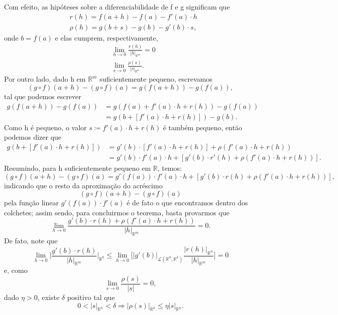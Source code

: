 \documentclass[../analysisII_notes.tex]{subfiles}
\begin{document}
\begin{proof*}
	Com efeito, as hipóteses sobre a diferenciabilidade de f e g significam que
	\begin{align*}
		 & r(h) = f(a+h) - f(a) - f'(a) \cdot h     \\
		 & \rho(h) = g(b+s) - g(b) - g'(b) \cdot s,
	\end{align*}
	onde \(b = f(a)\) e elas cumprem, respectivamente,
	\begin{align*}
		 & \lim_{h\to 0}\frac{r(h)}{|h|_{\mathbb{R}^{m}}} = 0  \\
		 & \lim_{s\to 0}\frac{\rho (s)}{|s|_{\mathbb{R}^{n}}}.
	\end{align*}
	Por outro lado, dado h em \(\mathbb{R}^{m}\) suficientemente pequeno, escrevamos
	\[
		(g\circ f)(a+h) - (g\circ f)(a) = g(f(a+h))-g(f(a)),
	\]
	tal que podemos escrever
	\begin{align*}
		g(f(a+h)) - g(f(a)) & = g(f(a)+f'(a)\cdot h+r(h)) - g(f(a)) \\
		                    & = g(b+[f'(a)\cdot h + r(h)]) - g(b).
	\end{align*}
	Como h é pequeno, o valor \(s\coloneqq f'(a)\cdot h + r(h)\) é também pequeno, então podemos dizer que
	\begin{align*}
		g(b+[f'(a)\cdot h+r(h)]) & = g'(b)\cdot [f'(a)\cdot h + r(h)] + \rho(f'(a)\cdot h + r(h))             \\
		                         & = g'(b)\cdot f'(a)\cdot h + [g'(b)\cdot r'(h) + \rho (f'(a)\cdot h+r(h))].
	\end{align*}
	Resumindo, para h suficientemente pequeno em \(\mathbb{R}\), temos:
	\[
		(g\circ f)(a+h) - (g\circ f)(a) = g'(f(a))\cdot f'(a)\cdot h + [g'(b)\cdot r(h) + \rho (f'(a)\cdot h+r(h))],
	\]
	indicando que o resto da aproximação do acréscimo
	\[
		(g\circ f)(a+h) - (g\circ f)(a)
	\]
	pela função linear \(g'(f(a))\cdot f'(a)\) é de fato o que encontramos dentro dos colchetes; assim sendo, para concluirmos o teorema, basta provarmos que
	\[
		\lim_{h\to 0}\frac{g'(b)\cdot r(h) + \rho(f'(a)\cdot h + r(h))}{|h|_{\mathbb{R}^{m}}} = 0.
	\]
	De fato, note que
	\[
		\lim_{h\to 0}\biggl\vert \frac{g'(b)\cdot r(h)}{|h|_{\mathbb{R}^{m}}} \biggr\vert_{\mathbb{R}^{k}}\leq \lim_{h\to 0}\biggl[|g'(b)|_{\mathcal{L}(\mathbb{R}^{n}, \mathbb{R}^{k})}\frac{|r(h)|_{\mathbb{R}^{n}}}{|h|_{\mathbb{R}^{m}}}\biggr] = 0
	\]
	e, como
	\[
		\lim_{s\to 0}\frac{\rho (s)}{|s|} = 0,
	\]
	dado \(\eta > 0\), existe \(\delta \) positivo tal que
	\[
		0 < |s|_{\mathbb{R}^{n}}<\delta \Rightarrow |\rho(s)|_{\mathbb{R}^{k}}\leq \eta |s|_{\mathbb{R}^{n}}.
\]
\end{proof*}
\end{document}
